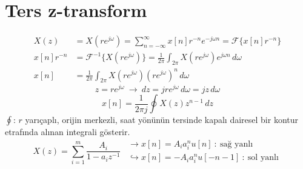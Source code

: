 \documentclass[11pt,a4paper]{article}
\begin{document}
\section{Ters z-transform}
\begin{align*}
  X(z)&=X(re^{j\omega})=\sum_{n=-\infty}^{\infty}x[n]r^{-n}e^{-j\omega n}=\mathcal{F}\{x[n]r^{-n}\}\\
  x[n]r^{-n}&=\mathcal{F}^{-1}\{X(re^{j\omega})\}=\frac{1}{2\pi}\int_{2\pi}X(re^{j\omega})e^{j\omega n}\,d\omega\\
  x[n]&=\frac{1}{2\pi}\int_{2\pi}X(re^{j\omega})(re^{j\omega})^n\,d\omega
\end{align*}
\[ z=re^{j\omega}\ \longrightarrow\ dz=jre^{j\omega}\,d\omega=jz\,d\omega \]
\[ x[n]=\frac{1}{2\pi j}\oint X(z)z^{n-1}\,dz \]
$\oint$: $r$ yarıçaplı, orijin merkezli, saat yönünün tersinde kapalı dairesel bir kontur etrafında alınan integrali gösterir.
\[
  X(z)=\sum_{i=1}^{m}\frac{A_i}{1-a_iz^{-1}}\ \
  \begin{array}{l}
    \longrightarrow x[n]=A_ia_i^nu[n]\ :\ \text{sağ yanlı}\\[1mm]
    \hookrightarrow x[n]=-A_ia_i^nu[-n-1]\ :\ \text{sol yanlı}
  \end{array}
\]
\end{document}
